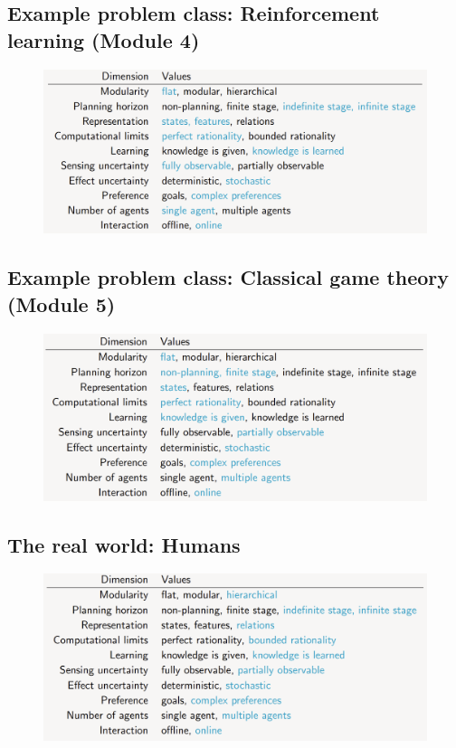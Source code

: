 \documentclass[12pt]{article}
\begin{document}
\newpage 
\subsection*{Example problem class: Reinforcement learning (Module 4)}

\begin{figure}[h!]
        \centering
        \includegraphics[scale=0.4]{module-4.png}
        \caption{}
        \label{fig:my_label}
\end{figure}

\subsection*{Example problem class: Classical game theory (Module 5)}

\begin{figure}[h!]
        \centering
        \includegraphics[scale=0.4]{module-5.png}
        \caption{}
        \label{fig:my_label}
\end{figure}

\newpage
\subsection*{The real world: Humans}

\begin{figure}[h!]
        \centering
        \includegraphics[scale=0.4]{human-dimensions.png}
        \caption{}
        \label{fig:my_label}
\end{figure}
\end{document}
